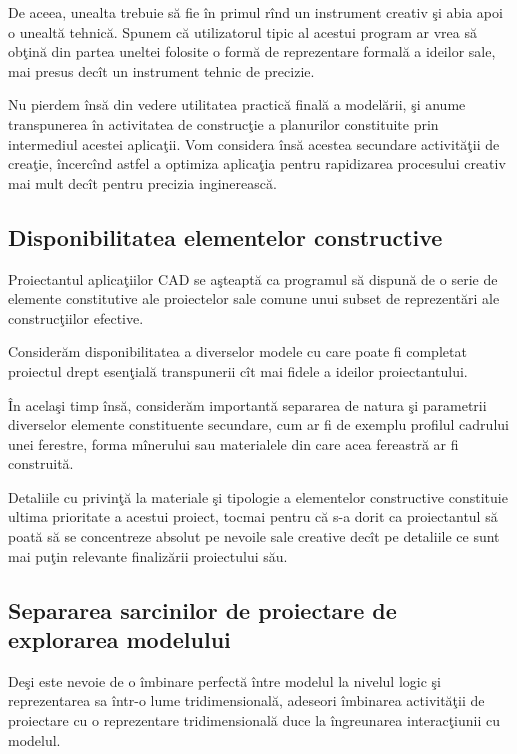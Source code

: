 De aceea, unealta trebuie să fie în primul rînd un instrument creativ şi abia
apoi o unealtă tehnică. Spunem că utilizatorul tipic al acestui program ar vrea
să obţină din partea uneltei folosite o formă de reprezentare formală a ideilor
sale, mai presus decît un instrument tehnic de precizie.

Nu pierdem însă din vedere utilitatea practică finală a modelării, şi anume
transpunerea în activitatea de construcţie a planurilor constituite prin
intermediul acestei aplicaţii. Vom considera însă acestea secundare activităţii
de creaţie, încercînd astfel a optimiza aplicaţia pentru rapidizarea procesului
creativ mai mult decît pentru precizia inginerească.

\subsection{Disponibilitatea elementelor constructive}

Proiectantul aplicaţiilor CAD se aşteaptă ca programul să dispună de o serie de
elemente constitutive ale proiectelor sale comune unui subset de reprezentări
ale construcţiilor efective.

Considerăm disponibilitatea a diverselor modele cu care poate fi completat
proiectul drept esenţială transpunerii cît mai fidele a ideilor proiectantului.

În acelaşi timp însă, considerăm importantă separarea de natura şi parametrii
diverselor elemente constituente secundare, cum ar fi de exemplu
profilul cadrului unei ferestre, forma mînerului sau materialele din care acea
fereastră ar fi construită.

Detaliile cu privinţă la materiale şi tipologie a elementelor constructive
constituie ultima prioritate a acestui proiect, tocmai pentru că s-a dorit ca
proiectantul să poată să se concentreze absolut pe nevoile sale creative decît
pe detaliile ce sunt mai puţin relevante finalizării proiectului său.

\subsection{Separarea sarcinilor de proiectare de explorarea modelului}

Deşi este nevoie de o îmbinare perfectă între modelul la nivelul logic şi
reprezentarea sa într-o lume tridimensională, adeseori îmbinarea activităţii de
proiectare cu o reprezentare tridimensională duce la îngreunarea interacţiunii
cu modelul.

